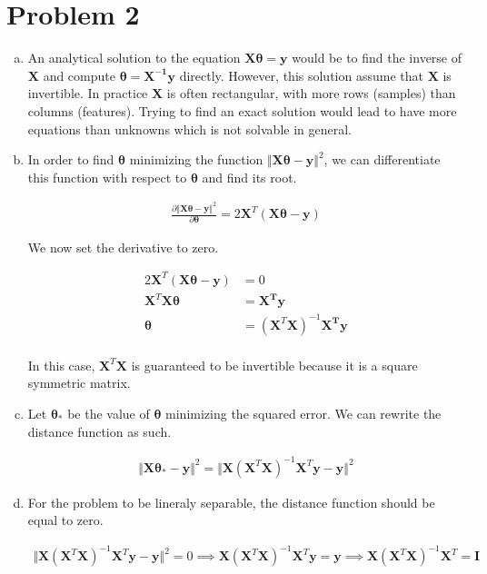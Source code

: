 \documentclass[a4paper, 10pt, twoside]{article}
\begin{document}
\section*{Problem 2}
\begin{enumerate}[a)]
    \item An analytical solution to the equation $\bm{X\theta}= \bm{y}$ would be to find the inverse of $\bm{X}$ and compute $\bm{\theta} = \bm{X^{-1}y}$ directly. However, this solution assume that $\bm{X}$ is invertible. In practice $\bm{X}$ is often rectangular, with more rows (samples) than columns (features). Trying to find an exact solution would lead to have more equations than unknowns which is not solvable in general.

    \item  In order to find $\bm{\theta}$ minimizing the function $\Vert \bm{X \theta - y} \Vert^2$, we can differentiate this function with respect to $\bm{\theta}$ and find its root.

          \begin{align*}
              \frac{\partial \Vert \bm{X \theta} - \bm{y} \Vert^2}{\partial \bm{\theta}}
              = 2 \bm{X}^T(\bm{X \theta - y})
          \end{align*}

          We now set the derivative to zero.

          \begin{align*}
              2 \bm{X}^T(\bm{X \theta} - \bm{y}) & = 0                                   \\
              \bm{X}^T\bm{X \theta }             & = \bm{X^T y}                          \\
              \bm{\theta}                        & = ( \bm{X}^T \bm{X} )^{-1} \bm{X^T y} \\
          \end{align*}

          In this case, $\bm{X}^T \bm{X}$ is guaranteed to be invertible because it is a square symmetric matrix.

    \item Let $\bm{\theta_*}$ be the value of $\bm{\theta}$ minimizing the squared error. We can rewrite the distance function as such.

          \begin{align*}
              \Vert \bm{X \theta_* - y} \Vert^2 = \Vert \bm{X} (\bm{X}^T\bm{X})^{-1}\bm{X}^T \bm{y} - \bm{y} \Vert^2
          \end{align*}

    \item For the problem to be lineraly separable, the distance function should be equal to zero.

          \begin{align*}
              \Vert \bm{X} (\bm{X}^T\bm{X})^{-1}\bm{X}^T \bm{y} - \bm{y} \Vert^2 = 0
              \implies
              \bm{X} (\bm{X}^T\bm{X})^{-1}\bm{X}^T \bm{y} = \bm{y}
              \implies
              \bm{X} (\bm{X}^T\bm{X})^{-1}\bm{X}^T = \bm{I}
          \end{align*}

\end{enumerate}
\end{document}
